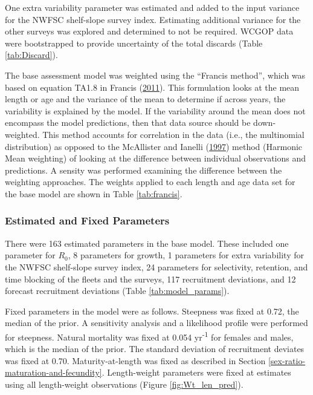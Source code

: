 \documentclass[12pt,]{article}
\begin{document}
One extra variability parameter was estimated and added to the input
variance for the NWFSC shelf-slope survey index. Estimating additional
variance for the other surveys was explored and determined to not be
required. WCGOP data were bootstrapped to provide uncertainty of the
total discards (Table \ref{tab:Discard}).

The base assessment model was weighted using the ``Francis method'',
which was based on equation TA1.8 in Francis
(\protect\hyperlink{ref-francis_data_2011}{2011}). This formulation
looks at the mean length or age and the variance of the mean to
determine if across years, the variability is explained by the model. If
the variability around the mean does not encompass the model
predictions, then that data source should be down-weighted. This method
accounts for correlation in the data (i.e., the multinomial
distribution) as opposed to the McAllister and Ianelli
(\protect\hyperlink{ref-mcallister_bayesian_1997}{1997}) method
(Harmonic Mean weighting) of looking at the difference between
individual observations and predictions. A sensity was performed
examining the difference between the weighting approaches. The weights
applied to each length and age data set for the base model are shown in
Table \ref{tab:francis}.

\subsubsection{Estimated and Fixed
Parameters}\label{estimated-and-fixed-parameters}

There were 163 estimated parameters in the base model. These included
one parameter for \(R_0\), 8 parameters for growth, 1 parameters for
extra variability for the NWFSC shelf-slope survey index, 24 parameters
for selectivity, retention, and time blocking of the fleets and the
surveys, 117 recruitment deviations, and 12 forecast recruitment
deviations (Table \ref{tab:model_params}).

Fixed parameters in the model were as follows. Steepness was fixed at
0.72, the median of the prior. A sensitivity analysis and a likelihood
profile were performed for steepness. Natural mortality was fixed at
0.054 yr\textsuperscript{-1} for females and males, which is the median
of the prior. The standard deviation of recruitment deviates was fixed
at 0.70. Maturity-at-length was fixed as described in Section
\ref{sex-ratio-maturation-and-fecundity}. Length-weight parameters were
fixed at estimates using all length-weight observations (Figure
\ref{fig:Wt_len_pred}).
\end{document}
